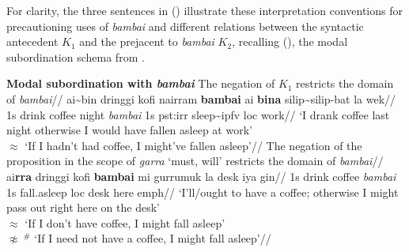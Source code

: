 \noindent For clarity, the three sentences in () illustrate these interpretation conventions for precautioning uses of \textit{bambai} and different relations between the syntactic antecedent $ \mathit{K_1} $ and the prejacent to \textit{bambai} $ \mathit{K_2} $, recalling (), the modal subordination schema from \citet{Roberts2020}.

\pex[interpartskip=2ex,nopreamble=false]\textbf{Modal subordination with \textit{bambai}}
\a\begingl\glpreamble The negation of $ \mathit{K_1} $ restricts the domain of \textit{bambai}//
\gla \nogloss{{[$ _\mathit{{K_1}} $}} ai\textasciitilde{}bin dringgi kofi nairram \nogloss{]} \textbf{bambai} ai \textbf{bina} silip\textasciitilde{}silip-bat la wek//
\glb 1s drink coffee night \textit{bambai} 1s {\sc pst:irr} sleep\textasciitilde\gls{ipfv} {\sc loc} work//
\glft`I drank coffee last night otherwise I would have fallen asleep at work'\\
$ \approx $ `If I hadn't had coffee, I might've fallen asleep'\trailingcitation[AJ 23022017]//
\endgl
\a\begingl\glpreamble The negation of the proposition in the scope of \textit{garra} `must, will' restricts the domain of \textit{bambai}//
\gla \nogloss{{[$ _\mathit{{K_1}} $}} ai\textbf{\textdblhyphen{}rra} dringgi kofi  \nogloss{]} \textbf{bambai} mi gurrumuk la desk iya gin//
\glb 1s drink coffee \textit{bambai} 1s fall.asleep {\sc loc} desk here {\sc emph}//
\glft `I'll/ought to have a coffee; otherwise I might pass out right here on the desk'\trailingcitation{[GT~28052016]}\\
$ \approx $ `If I don't have coffee, I might fall asleep'\\
$ \not\approx\ ^\#\!{} $ `If I need not have a coffee, I might fall asleep'//\endgl

